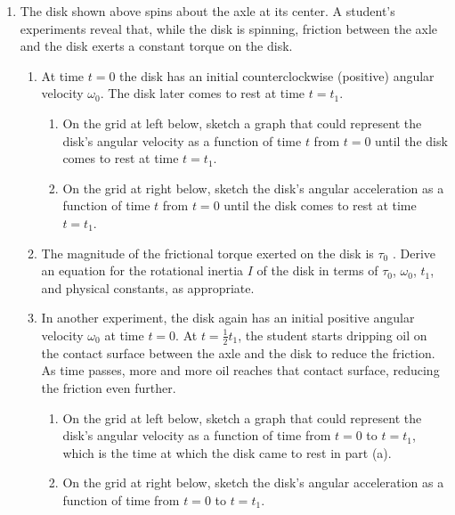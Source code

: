 \documentclass{../../../oss-apphys}
\begin{document}
\begin{enumerate}[leftmargin=15pt]
  \begin{center}
  \end{center}
\item The disk shown above spins about the axle at its center. A student's
  experiments reveal that, while the disk is spinning, friction between the
  axle and the disk exerts a constant torque on the disk.
  \begin{enumerate}[leftmargin=15pt]
  \item At time $t=0$ the disk has an initial counterclockwise (positive)
    angular velocity $\omega_0$. The disk later comes to rest at time $t=t_1$.
    \begin{enumerate}[leftmargin=15pt]
    \item On the grid at left below, sketch a graph that could represent the
      disk's angular velocity as a function of time $t$ from $t=0$ until the
      disk comes to rest at time $t=t_1$.   
    \item On the grid at right below, sketch the disk's angular acceleration as
      a function of time $t$ from $t=0$ until the disk comes to rest at time
      $t=t_1$.   
    \end{enumerate}
    \begin{center}
  \end{center}
  \item The magnitude of the frictional torque exerted on the disk is
    $\tau_0$ . Derive an equation for the rotational inertia $I$ of the disk in
    terms of $\tau_0$, $\omega_0$, $t_1$, and physical constants, as
    appropriate.
    \vspace{.75in}
    \newpage
    
  \item In another experiment, the disk again has an initial positive angular
    velocity $\omega_0$ at time $t=0$. At $\displaystyle t=\frac12t_1$, the
    student starts dripping oil on the contact surface between the axle and the
    disk to reduce the friction. As time passes, more and more oil reaches that
    contact surface, reducing the friction even further.
    \begin{enumerate}[leftmargin=15pt]
    \item On the grid at left below, sketch a graph that could represent the
      disk's angular velocity as a function of time from $t=0$ to $t=t_1$,
      which is the time at which the disk came to rest in part (a).
    \item On the grid at right below, sketch the disk's angular acceleration
      as a function of time from $t=0$ to $t=t_1$.
    \end{enumerate}
    \begin{center}
    \end{center}
    

\end{enumerate}
\end{enumerate}
\end{document}
